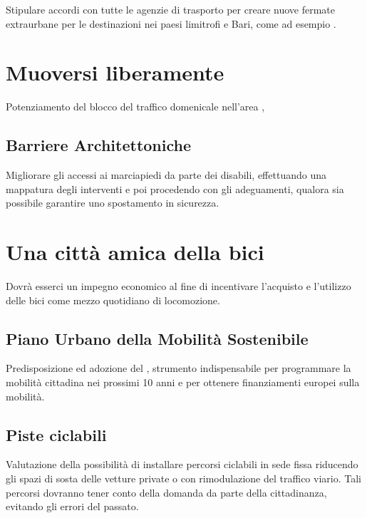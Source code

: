 \documentclass[a4paper,14pt,italian]{sphinxmanual}
\begin{document}
Stipulare accordi con tutte le agenzie di trasporto per creare nuove fermate extraurbane per le destinazioni nei paesi limitrofi e Bari, come ad esempio .


\section{Muoversi liberamente}
\label{\detokenize{mobilita:muoversi-liberamente}}
Potenziamento del blocco del traffico domenicale nell’area ,


\subsection{Barriere Architettoniche}
\label{\detokenize{mobilita:barriere-architettoniche}}
Migliorare gli accessi ai marciapiedi da parte dei disabili, effettuando una mappatura degli interventi e poi procedendo con gli adeguamenti, qualora sia possibile garantire uno spostamento in sicurezza.


\section{Una città amica della bici}
\label{\detokenize{mobilita:una-citta-amica-della-bici}}
Dovrà esserci un impegno economico al fine di incentivare l’acquisto e l’utilizzo delle bici come mezzo quotidiano di locomozione.


\subsection{Piano Urbano della Mobilità Sostenibile}
\label{\detokenize{mobilita:piano-urbano-della-mobilita-sostenibile}}
Predisposizione ed adozione del , strumento indispensabile per programmare la mobilità cittadina nei prossimi 10 anni e per ottenere finanziamenti europei sulla mobilità.


\subsection{Piste ciclabili}
\label{\detokenize{mobilita:piste-ciclabili}}
Valutazione della possibilità di installare percorsi ciclabili in sede fissa riducendo gli spazi di sosta delle vetture private o con rimodulazione del traffico viario.
Tali percorsi dovranno tener conto della domanda da parte della cittadinanza, evitando gli errori del passato.
\end{document}
